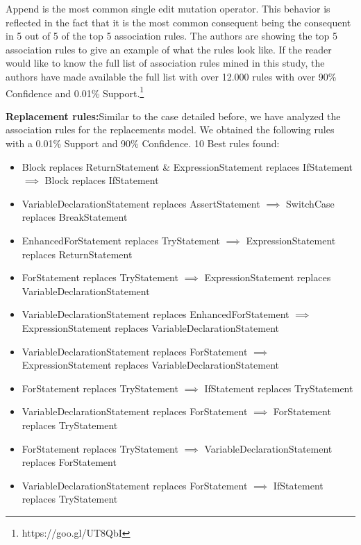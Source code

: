 \documentclass[conference]{IEEEtran}
\begin{document}
Append is the most common single edit mutation operator. This behavior is
reflected in the fact that it is the most common consequent being the consequent
in 5 out of 5 of the top 5 association rules. The authors are showing the top 5
association rules to give an example of what the rules look like. If the reader
would like to know the full list of association rules mined in this study, the
authors have made available the full list with over 12.000 rules with over 90\%
Confidence and 0.01\% Support.\footnote{https://goo.gl/UT8QbI} 

\textbf{Replacement rules:}Similar to the case detailed before, we have analyzed the association rules for the replacements model. 
We obtained the following rules with a 0.01\% Support and 90\% Confidence.
10 Best rules found:
\begin{itemize}
\item Block replaces ReturnStatement \& ExpressionStatement replaces IfStatement $\implies$ Block replaces IfStatement
\item VariableDeclarationStatement replaces AssertStatement $\implies$ SwitchCase replaces BreakStatement
\item EnhancedForStatement replaces TryStatement $\implies$ ExpressionStatement replaces ReturnStatement
\item ForStatement replaces TryStatement $\implies$ ExpressionStatement replaces VariableDeclarationStatement
\item VariableDeclarationStatement replaces EnhancedForStatement $\implies$ ExpressionStatement replaces VariableDeclarationStatement
\item VariableDeclarationStatement replaces ForStatement $\implies$ ExpressionStatement replaces VariableDeclarationStatement
\item ForStatement replaces TryStatement $\implies$ IfStatement replaces TryStatement
\item VariableDeclarationStatement replaces ForStatement $\implies$ ForStatement replaces TryStatement
\item ForStatement replaces TryStatement $\implies$ VariableDeclarationStatement replaces ForStatement
\item VariableDeclarationStatement replaces ForStatement $\implies$ IfStatement replaces TryStatement
\end{itemize}
\end{document}
